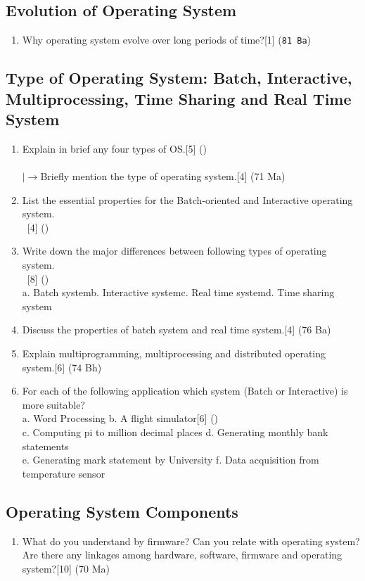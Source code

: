 \documentclass[12pt]{article}
\newcommand{\lb}{\\$\left|\rightarrow\right.$}
\newcommand{\enter}{\\\textcolor{white}{1}}
\begin{document}
	\subsection{Evolution of Operating System}
	\begin{enumerate}
	\item Why operating system evolve over long periods of time?\hfill[1] (\texttt{81 Ba})
	\end{enumerate}
	\subsection{Type of Operating System: Batch, Interactive, Multiprocessing, Time Sharing and Real Time System}
	\begin{enumerate}
	\item Explain in brief any four types of OS.\hfill[5] ()\\
	\lb Briefly mention the type of operating system.\hfill[4] (71 Ma)
	\item List the essential properties for the Batch-oriented and Interactive operating system.
	\enter\hfill[4] ()
	\item Write down the major differences between following types of operating system.
	\enter\hfill[8] ()\\
	a. Batch system\hspace{7mm}b. Interactive system\hspace{7mm}c. Real time system\hspace{7mm}d. Time sharing system
	\item Discuss the properties of batch system and real time system.\hfill[4] (76 Ba)
	\item Explain multiprogramming, multiprocessing and distributed operating system.\hfill[6] (74 Bh)
	\item For each of the following application which system (Batch or Interactive) is more suitable?\\
	a. Word Processing \hspace{5cm}b. A flight simulator\hfill[6] ()\\
	c. Computing pi to million decimal places\hspace{9mm} d. Generating monthly bank statements\\ 
	e. Generating mark statement by University \hspace{7mm}f. Data acquisition from temperature sensor
	\end{enumerate}
	\subsection{Operating System Components}
	\begin{enumerate}
	\item What do you understand by firmware? Can you relate with operating system? Are there any linkages among hardware, software, firmware and operating system?\hfill[10] (70 Ma)
	\end{enumerate}
\end{document}

